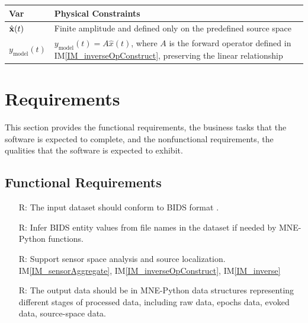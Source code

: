 \documentclass[12pt]{article}
\newcommand{\iref}[1]{IM\ref{#1}}
\newcounter{reqnum} %
\begin{document}
\begin{table}[!h]
\caption{Output Variables} \label{TblOutputVar}
\renewcommand{\arraystretch}{1.2}
\noindent \begin{longtable*}{l p{0.65\textwidth}} 
\toprule
\textbf{Var} & \textbf{Physical Constraints} \\
\midrule

    $\hat{\bf x}(t)$ &
    Finite amplitude and defined only on the predefined source space \\

    ${y}_{\text{model}}(t)$ &
    ${y}_{\text{model}}(t) = A \hat{x}(t)$, where $A$ is the forward operator defined in \iref{IM_inverseOpConstruct}, preserving the linear relationship \\

\bottomrule
\end{longtable*}
\end{table}








\section{Requirements} \label{Requirements}


This section provides the functional requirements, the business tasks that the software is expected to complete, and the nonfunctional requirements, the qualities that the software is expected to exhibit.




\subsection{Functional Requirements}


\noindent \begin{itemize}

    \item[R\refstepcounter{reqnum}\thereqnum \label{R_BIDS}:] The input dataset should conform to BIDS format \citep{gorgolewski_et_al_2016}.
    
    \item[R\refstepcounter{reqnum}\thereqnum \label{R_Infer}:] Infer BIDS entity values from file names in the dataset if needed by MNE-Python functions.

    \item[R\refstepcounter{reqnum}\thereqnum \label{R_Configuration}:] Support sensor space analysis and source localization. \iref{IM_sensorAggregate}, \iref{IM_inverseOpConstruct}, \iref{IM_inverse}

    \item[R\refstepcounter{reqnum}\thereqnum \label{R_Output}:] The output data should be in MNE-Python data structures representing different stages of processed data, including raw data, epochs data, evoked data, source-space data.

\end{itemize}
\end{document}
